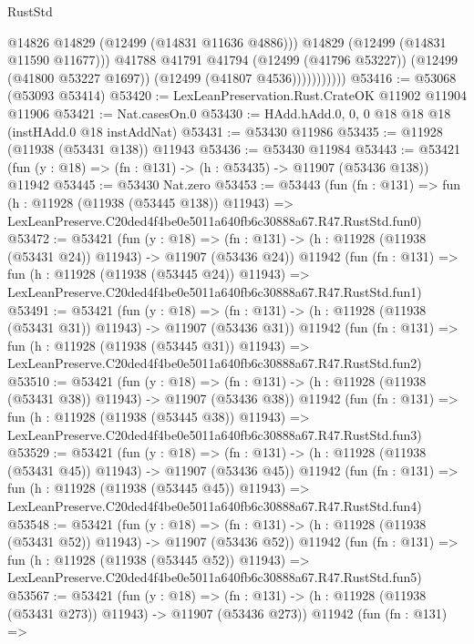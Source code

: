 \begin{lexlean}{RustStd}
\begin{coremodule}
                          @14826
                          @14829
                          (@12499 (@14831 @11636 @4886)))
                        @14829
                        (@12499 (@14831 @11590 @11677)))
                      @41788
                      @41791
                      @41794
                      (@12499 (@41796 @53227))
                      (@12499 (@41800 @53227 @1697))
                      (@12499 (@41807 @4536)))))))))))
@53416 := @53068 (@53093 @53414)
@53420 := LexLeanPreservation.Rust.CrateOK @11902 @11904 @11906
@53421 := Nat.casesOn.{0}
@53430 := HAdd.hAdd.{0, 0, 0} @18 @18 @18 (instHAdd.{0} @18 instAddNat)
@53431 := @53430 @11986
@53435 := @11928 (@11938 (@53431 @138)) @11943
@53436 := @53430 @11984
@53443 := @53421 (fun (y : @18) => (fn : @131) -> (h : @53435) -> @11907 (@53436 @138)) @11942
@53445 := @53430 Nat.zero
@53453 := @53443
    (fun (fn : @131) =>
    fun (h : @11928 (@11938 (@53445 @138)) @11943) =>
    LexLeanPreserve.C20ded4f4be0e5011a640fb6c30888a67.R47.RustStd.fun0)
@53472 := @53421
    (fun (y : @18) =>
    (fn : @131) -> (h : @11928 (@11938 (@53431 @24)) @11943) -> @11907 (@53436 @24))
    @11942
    (fun (fn : @131) =>
    fun (h : @11928 (@11938 (@53445 @24)) @11943) =>
    LexLeanPreserve.C20ded4f4be0e5011a640fb6c30888a67.R47.RustStd.fun1)
@53491 := @53421
    (fun (y : @18) =>
    (fn : @131) -> (h : @11928 (@11938 (@53431 @31)) @11943) -> @11907 (@53436 @31))
    @11942
    (fun (fn : @131) =>
    fun (h : @11928 (@11938 (@53445 @31)) @11943) =>
    LexLeanPreserve.C20ded4f4be0e5011a640fb6c30888a67.R47.RustStd.fun2)
@53510 := @53421
    (fun (y : @18) =>
    (fn : @131) -> (h : @11928 (@11938 (@53431 @38)) @11943) -> @11907 (@53436 @38))
    @11942
    (fun (fn : @131) =>
    fun (h : @11928 (@11938 (@53445 @38)) @11943) =>
    LexLeanPreserve.C20ded4f4be0e5011a640fb6c30888a67.R47.RustStd.fun3)
@53529 := @53421
    (fun (y : @18) =>
    (fn : @131) -> (h : @11928 (@11938 (@53431 @45)) @11943) -> @11907 (@53436 @45))
    @11942
    (fun (fn : @131) =>
    fun (h : @11928 (@11938 (@53445 @45)) @11943) =>
    LexLeanPreserve.C20ded4f4be0e5011a640fb6c30888a67.R47.RustStd.fun4)
@53548 := @53421
    (fun (y : @18) =>
    (fn : @131) -> (h : @11928 (@11938 (@53431 @52)) @11943) -> @11907 (@53436 @52))
    @11942
    (fun (fn : @131) =>
    fun (h : @11928 (@11938 (@53445 @52)) @11943) =>
    LexLeanPreserve.C20ded4f4be0e5011a640fb6c30888a67.R47.RustStd.fun5)
@53567 := @53421
    (fun (y : @18) =>
    (fn : @131) -> (h : @11928 (@11938 (@53431 @273)) @11943) -> @11907 (@53436 @273))
    @11942
    (fun (fn : @131) =>

\end{coremodule}
\end{lexlean}
